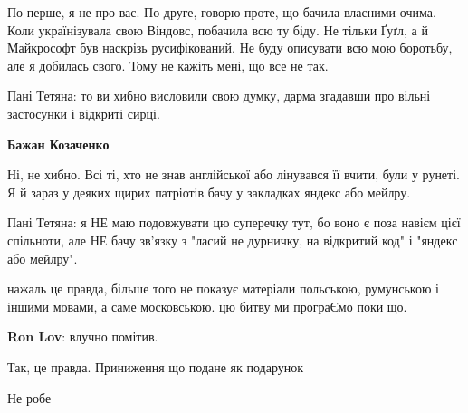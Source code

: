\begin{itemize}
\begin{itemize}
\begin{itemize}
По-перше, я не про вас. По-друге, говорю проте, що бачила власними очима. Коли
українізувала свою Віндовс, побачила всю ту біду. Не тільки Ґуґл, а й
Майкрософт був наскрізь русифікований. Не буду описувати всю мою боротьбу, але
я добилась свого. Тому не кажіть мені, що все не так.


Пані Тетяна: то ви хибно висловили свою думку, дарма згадавши про вільні
застосунки і відкриті сирці.

\textbf{Бажан Козаченко} 

Ні, не хибно. Всі ті, хто не знав англійської або лінувався її вчити, були у
рунеті. Я й зараз у деяких щирих патріотів бачу у закладках яндекс або мейлру.


Пані Тетяна: я НЕ маю подовжувати цю суперечку тут, бо воно є поза навієм цієї
спільноти, але НЕ бачу зв'язку з "ласий не дурничку, на відкритий код" і
"яндекс або мейлру".

\end{itemize} %

\end{itemize} %


нажаль це правда, більше того не показує матеріали польською, румунською і
іншими мовами, а саме московською. цю битву ми програЄмо поки що.

\begin{itemize} %
\textbf{Ron Lov}: влучно помітив.
\end{itemize} %

Так, це правда. Приниження що подане як подарунок

Не робе

\end{itemize} %
